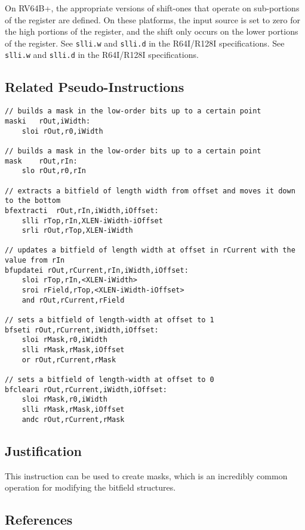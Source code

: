 On RV64B+, the appropriate versions of shift-ones that operate on
sub-portions of the register are defined. On these platforms, the input
source is set to zero for the high portions of the register, and the
shift only occurs on the lower portions of the register. See
\texttt{slli.w} and \texttt{slli.d} in the R64I/R128I specifications.
See \texttt{slli.w} and \texttt{slli.d} in the R64I/R128I
specifications.

\subsection{Related Pseudo-Instructions}

\begin{verbatim}
// builds a mask in the low-order bits up to a certain point
maski   rOut,iWidth:
    sloi rOut,r0,iWidth

// builds a mask in the low-order bits up to a certain point
mask    rOut,rIn:
    slo rOut,r0,rIn

// extracts a bitfield of length width from offset and moves it down to the bottom
bfextracti  rOut,rIn,iWidth,iOffset:
    slli rTop,rIn,XLEN-iWidth-iOffset
    srli rOut,rTop,XLEN-iWidth

// updates a bitfield of length width at offset in rCurrent with the value from rIn
bfupdatei rOut,rCurrent,rIn,iWidth,iOffset:
    sloi rTop,rIn,<XLEN-iWidth>
    sroi rField,rTop,<XLEN-iWidth-iOffset>
    and rOut,rCurrent,rField

// sets a bitfield of length-width at offset to 1
bfseti rOut,rCurrent,iWidth,iOffset:
    sloi rMask,r0,iWidth
    slli rMask,rMask,iOffset
    or rOut,rCurrent,rMask

// sets a bitfield of length-width at offset to 0
bfcleari rOut,rCurrent,iWidth,iOffset:
    sloi rMask,r0,iWidth
    slli rMask,rMask,iOffset
    andc rOut,rCurrent,rMask
\end{verbatim}

\subsection{Justification}

This instruction can be used to create masks, which is an incredibly
common operation for modifying the bitfield structures.

\subsection{References}

